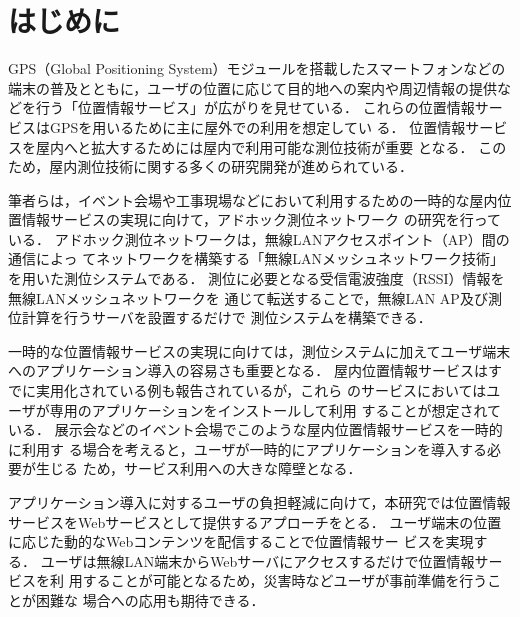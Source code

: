 \documentclass[technicalreport]{ieicej}
\begin{document}
\maketitle

\section{はじめに}
\label{sec:intro}

GPS（Global Positioning System）モジュールを搭載したスマートフォンなどの
端末の普及とともに，ユーザの位置に応じて目的地への案内や周辺情報の提供な
どを行う「位置情報サービス」が広がりを見せている．
これらの位置情報サービスはGPSを用いるために主に屋外での利用を想定してい
る．
位置情報サービスを屋内へと拡大するためには屋内で利用可能な測位技術が重要
となる．
このため，屋内測位技術に関する多くの研究開発が進められている．

筆者らは，イベント会場や工事現場などにおいて利用するための一時的な屋内位
置情報サービスの実現に向けて，アドホック測位ネットワーク
\cite{izumi13:awpn_acc_imprv}の研究を行っている．
アドホック測位ネットワークは，無線LANアクセスポイント（AP）間の通信によっ
てネットワークを構築する「無線LANメッシュネットワーク技術」
\cite{sakata06:ad-hoc_wlan_mesh}を用いた測位システムである．
測位に必要となる受信電波強度（RSSI）情報を無線LANメッシュネットワークを
通じて転送することで，無線LAN AP及び測位計算を行うサーバを設置するだけで
測位システムを構築できる．

一時的な位置情報サービスの実現に向けては，測位システムに加えてユーザ端末
へのアプリケーション導入の容易さも重要となる．
屋内位置情報サービスはすでに実用化されている例も報告されているが，これら
のサービスにおいてはユーザが専用のアプリケーションをインストールして利用
することが想定されている．
展示会などのイベント会場でこのような屋内位置情報サービスを一時的に利用す
る場合を考えると，ユーザが一時的にアプリケーションを導入する必要が生じる
ため，サービス利用への大きな障壁となる．

アプリケーション導入に対するユーザの負担軽減に向けて，本研究では位置情報
サービスをWebサービスとして提供するアプローチをとる．
ユーザ端末の位置に応じた動的なWebコンテンツを配信することで位置情報サー
ビスを実現する．
ユーザは無線LAN端末からWebサーバにアクセスするだけで位置情報サービスを利
用することが可能となるため，災害時などユーザが事前準備を行うことが困難な
場合への応用も期待できる．
\end{document}
